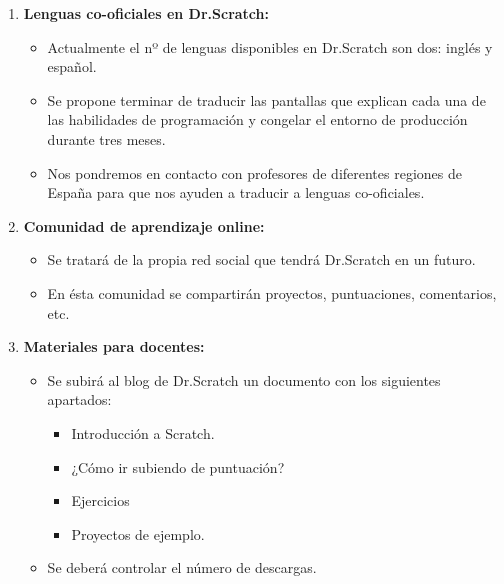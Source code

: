 \documentclass[a4paper,12pt]{letter}
\begin{document}
\begin{letter}
\begin{enumerate}
    
    \item {\textbf {Lenguas co-oficiales en Dr.Scratch:}}
    \begin{itemize}
        \item {Actualmente el nº de lenguas disponibles en Dr.Scratch son dos: inglés y español.}
        \item {Se propone terminar de traducir las pantallas que explican cada una de las habilidades de programación y congelar el entorno de producción durante tres meses.}
        \item {Nos pondremos en contacto con profesores de diferentes regiones de España para que nos ayuden a traducir a lenguas co-oficiales.}
    \end{itemize}

    \item{\textbf {Comunidad de aprendizaje online:}}
    \begin{itemize}
        \item {Se tratará de la propia red social que tendrá Dr.Scratch en un futuro.}
        \item {En ésta comunidad se compartirán proyectos, puntuaciones, comentarios, etc.}

    \end{itemize}

	\item{\textbf {Materiales para docentes:}}
    \begin{itemize}
        \item {Se subirá al blog de Dr.Scratch un documento con los siguientes apartados:}
        \begin{itemize}
            \item {Introducción a Scratch.}
            \item {¿Cómo ir subiendo de puntuación?}
            \item {Ejercicios} 
            \item {Proyectos de ejemplo.} 
        \end{itemize}
        \item {Se deberá controlar el número de descargas.}
    \end{itemize}
        

\end{enumerate}
\end{letter}
\end{document}
